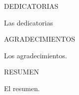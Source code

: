 \documentclass[letterpaper,12pt]{report}
\begin{document}


\thispagestyle{empty}\null\newpage

\thispagestyle{empty}\null

\centering
\thispagestyle{empty}
\Large DEDICATORIAS\par
\vspace{3cm}
\justify
\normalsize

Las dedicatorias

\newpage
\centering
\thispagestyle{empty}
\Large AGRADECIMIENTOS\par
\vspace{3cm}
\justify
\normalsize

Los agradecimientos.

\newpage
\centering
\thispagestyle{empty}
\Large RESUMEN\par
\vspace{3cm}
\justify
\normalsize

El resumen.

\newpage
\tableofcontents
\thispagestyle{empty}
\pagebreak


\thispagestyle{empty}
\listoffigures
\pagebreak

\thispagestyle{empty}
\listoftables
\pagebreak
\setcounter{page}{1}












\end{document}
